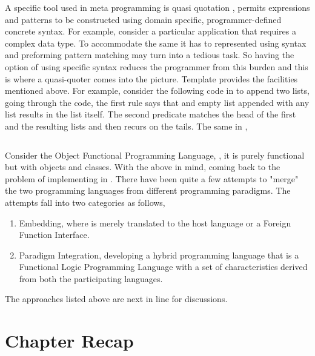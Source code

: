 \documentclass[thesis-solanki.tex]{subfiles}
\begin{document}
A specific tool used in meta programming is quasi quotation \cite{mainland2007s,haskellquasi,wikiquasi}, permits  expressions 
and patterns to be constructed using domain specific, programmer-defined concrete syntax. For example, consider a particular application that requires a 
complex data type. To accommodate the same it has to represented using  syntax and preforming pattern matching may turn into a 
tedious task. So having the option of using specific syntax reduces the programmer from this burden and this is where a quasi-quoter comes into the 
picture. Template  provides the facilities mentioned above. For example, consider the following code in  to append 
two lists,
going through the code, the first rule says that and empty list appended with any list results in the list itself. The second predicate matches the head of the 
first and the resulting lists and then recurs on the tails. The same in ,

\inputminted[linenos]{haskell}{append.pl}

Consider the Object Functional Programming Language,  \cite{website:scala}, it is purely functional but with objects 
and classes. With the above in mind, coming back to the problem of implementing  in . There have been quite a few 
attempts to "merge" the two programming languages from different programming paradigms. The attempts fall into two categories as follows,

\begin{enumerate}
\item Embedding, where  is merely translated to the host language  or a Foreign Function Interface.

\item Paradigm Integration, developing a hybrid programming language that is a Functional Logic Programming Language with a set of characteristics 
derived from both the participating languages.
\end{enumerate}

The approaches listed above are next in line for discussions.  


\section{Chapter Recap}
\end{document}
